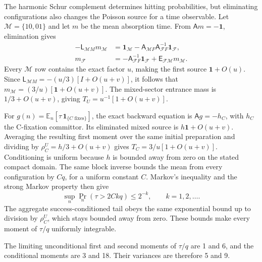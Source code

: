 \documentclass[aps,pre,reprint,amsmath,amssymb,longbibliography]{revtex4-2}
\newcommand{\E}{\mathbb E}
\begin{document}
The harmonic Schur complement determines hitting probabilities, but
eliminating configurations also changes the Poisson source for a time
observable. Let $\mathcal M=\{10,01\}$ and let $m$ be the mean
absorption time. From $\mathsf A m=-\mathbf1$, elimination gives
\begin{align}
 -\mathsf L_{\mathcal MM}m_{\mathcal M}
 &=\mathbf1_{\mathcal M}
 -\mathsf A_{\mathcal MF}\mathsf A_{\mathcal FF}^{-1}
       \mathbf1_{\mathcal F},\\
 m_{\mathcal F}&=-\mathsf A_{\mathcal FF}^{-1}\mathbf1_{\mathcal F}
 +\mathsf E_{\mathcal F\mathcal M}m_{\mathcal M}.
\end{align}
Every $\mathcal M$ row contains the exact factor $u$, making the
first source $\mathbf1+O(u)$. Since
$\mathsf L_{\mathcal MM}=-(u/3)[I+O(u+v)]$, it follows that
$m_{\mathcal M}=(3/u)[\mathbf1+O(u+v)]$. The mixed-sector entrance
mass is $1/3+O(u+v)$, giving $T_U=u^{-1}[1+O(u+v)]$.

For $g(n)=\E_n[\tau\,\mathbf1_{\{C\text{ fixes}\}}]$,
the exact backward equation is $\mathsf A g=-h_C$, with $h_C$ the
C-fixation committor. Its eliminated mixed source is
$h\mathbf1+O(u+v)$. Averaging the resulting first moment over the
same initial preparation and dividing by
$\rho_C^U=h/3+O(u+v)$ gives $T_C=3/u[1+O(u+v)]$.
Conditioning is uniform because $h$ is bounded away from zero on the
stated compact domain. The same block inverse bounds the mean from
every configuration by $Cq$, for a uniform constant $C$. Markov's
inequality and the strong Markov property then give
\begin{equation}
 \sup_n\Pr_n(\tau>2Ckq)\le 2^{-k},\qquad k=1,2,\ldots .
 \label{eq:app-p6-uniform-tail}
\end{equation}
The aggregate success-conditioned tail obeys the same exponential
bound up to division by $\rho_C^U$, which stays bounded away from zero.
These bounds make every moment of $\tau/q$ uniformly integrable.

The limiting unconditional first and second moments of $\tau/q$
are 1 and 6, and the conditional moments are 3 and 18. Their variances
are therefore 5 and 9.
\end{document}
